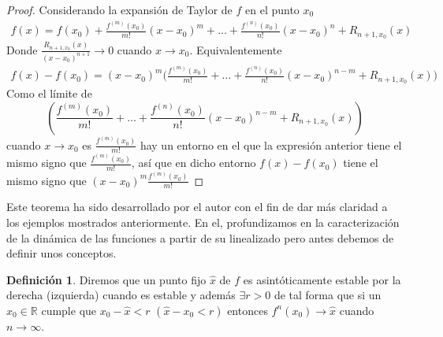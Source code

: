 \documentclass[12pt,a4paper]{report}
\theoremstyle{definition}
\newtheorem{definicion}{Definición}[section]
\begin{document}
\begin{proof}

Considerando la expansión de Taylor de $f$ en el punto $x_0$
\begin{align*}
f(x) = f(x_0) + \frac{f^{(m)}(x_0)}{m!}(x - x_0)^m + \ldots 
+ \frac{f^{(n)}(x_0)}{n!}(x - x_0)^n 
+ R_{n+1,x_0}(x)
\end{align*}
%
Donde $\frac{R_{n+1,x_0}(x)}{(x-x_0)^{n+1}} \to 0$ cuando $x \to x_0$. Equivalentemente
\begin{align*}
f(x) - f(x_0) = (x - x_0)^m \bigg( \frac{f^{(m)}(x_0)}{m!} + \ldots 
+ \frac{f^{(n)}(x_0)}{n!}(x - x_0)^{n-m} 
+ R_{n+1,x_0}(x) \bigg)
\end{align*}
%
Como el límite de 
$$
\left( \frac{f^{(m)}(x_0)}{m!} +  \ldots 
+ \frac{f^{(n)}(x_0)}{n!}(x - x_0)^{n-m} +  R_{n+1,x_0}(x) \right)
$$
%
cuando $x \to x_0$ es $\frac{f^{(m)}(x_0)}{m!}$ hay un entorno en el que la expresión anterior tiene el mismo signo que $\frac{f^{(m)}(x_0)}{m!}$, así que en dicho entorno $f(x) - f(x_0)$ tiene el mismo signo que $(x - x_0)^m \frac{f^{(m)}(x_0)}{m!}$

\end{proof}

Este teorema ha sido desarrollado por el autor con el fin de dar más claridad a los ejemplos mostrados anteriormente. En el, profundizamos en la caracterización de la dinámica de las funciones a partir de su linealizado pero antes debemos de definir unos conceptos.

\begin{definicion}

Diremos que un punto fijo $\hat{x}$ de $f$ es asintóticamente estable por la derecha (izquierda) cuando es estable y además $\exists r > 0$ de tal forma que si un $x_0 \in \mathbb{R}$ cumple que $x_0 - \hat{x} < r$ $( \hat{x} - x_0 < r)$ entonces $f^n(x_0) \rightarrow \hat{x}$ cuando $n \rightarrow \infty$.

\end{definicion}    
\end{document}
